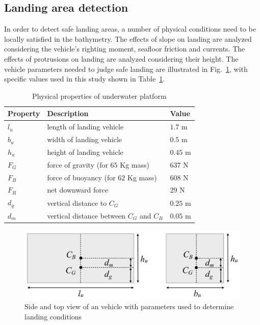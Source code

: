 \subsection{Landing area detection}
\label{sub:landingarea}

In order to detect safe landing areas, a number of physical conditions need to be locally satisfied in the bathymetry. The effects of slope on landing are analyzed considering the vehicle's righting moment, seafloor friction and currents. The effects of protrusions on landing are analyzed considering their height. The vehicle parameters needed to judge safe landing are illustrated in Fig.~\ref{f:mehul5}, with specific values used in this study shown in Table~\ref{t:table2}. 
 
\begin{table}[!ht]
\centering
\caption{Physical properties of underwater platform}
\begin{tabular}{ | p{4cm}  p{6cm} p{4cm} | }
\hline
\textbf{Property} & \textbf{Description} & \textbf{Value}\\ \hline 
$l_u$ & length of landing vehicle & $1.7$ m\\
$b_u$ & width of landing vehicle & $0.5$ m\\
$h_u$ & height of landing vehicle & $0.45$ m\\
$F_G$ & force of  gravity (for $65$ Kg mass) & $637$ N \\
$F_B$ & force of buoyancy (for $62$ Kg mass) & $608$ N \\
$F_R$ & net  downward force  & $29$ N \\
$d_g$ & vertical distance to $C_G$ & $0.25$ m \\
$d_m$ & vertical distance between $C_G$ and $C_B$ & $0.05$ m \\
\hline
\end{tabular}
\label{t:table2}
\end{table}

\begin{figure}[!ht]
\centering
\includegraphics[width=5.0in]{./images/mehul5.png}
\caption{Side and top view of an vehicle with parameters used to determine landing conditions}
\label{f:mehul5}
\end{figure}

